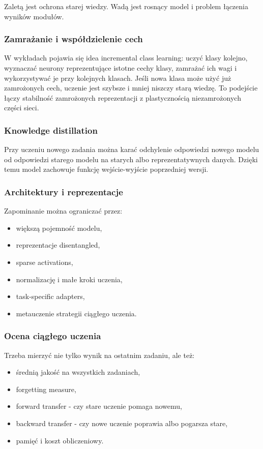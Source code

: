 Zaletą jest ochrona starej wiedzy. Wadą jest rosnący model i problem łączenia wyników modułów.

\subsubsection{Zamrażanie i współdzielenie cech}

W wykładach pojawia się idea incremental class learning: uczyć klasy kolejno, wyznaczać neurony reprezentujące istotne cechy klasy, zamrażać ich wagi i wykorzystywać je przy kolejnych klasach. Jeśli nowa klasa może użyć już zamrożonych cech, uczenie jest szybsze i mniej niszczy starą wiedzę. To podejście łączy stabilność zamrożonych reprezentacji z plastycznością niezamrożonych części sieci.

\subsubsection{Knowledge distillation}

Przy uczeniu nowego zadania można karać odchylenie odpowiedzi nowego modelu od odpowiedzi starego modelu na starych albo reprezentatywnych danych. Dzięki temu model zachowuje funkcję wejście-wyjście poprzedniej wersji.

\subsubsection{Architektury i reprezentacje}

Zapominanie można ograniczać przez:
\begin{itemize}
  \item większą pojemność modelu,
  \item reprezentacje disentangled,
  \item sparse activations,
  \item normalizację i małe kroki uczenia,
  \item task-specific adapters,
  \item metauczenie strategii ciągłego uczenia.
\end{itemize}

\subsubsection{Ocena ciągłego uczenia}

Trzeba mierzyć nie tylko wynik na ostatnim zadaniu, ale też:
\begin{itemize}
  \item średnią jakość na wszystkich zadaniach,
  \item forgetting measure,
  \item forward transfer - czy stare uczenie pomaga nowemu,
  \item backward transfer - czy nowe uczenie poprawia albo pogarsza stare,
  \item pamięć i koszt obliczeniowy.
\end{itemize}

